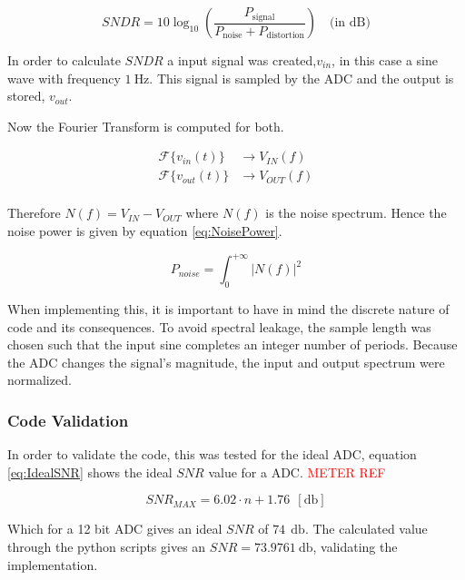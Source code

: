 \begin{equation}
    SNDR = 10 \log_{10} \left( \frac{P_{\text{signal}}}{P_{\text{noise}} + P_{\text{distortion}}} \right)  \quad \text{(in dB)}
    \label{eq:SNDR}
\end{equation}

In order to calculate $SNDR$ a input signal was created,$v_{in}$, in this case a sine wave with frequency $\SI{1}{\hertz}$. This signal is sampled by the ADC and the output is stored, $v_{out}$.

Now the Fourier Transform is computed for both.

\begin{equation}
    \begin{split}
        \mathcal{F}\{v_{in}(t)\} &\rightarrow V_{IN}(f)\\
        \mathcal{F}\{v_{out}(t)\} &\rightarrow V_{OUT}(f)\\
    \end{split}
    \label{eq:fourier}
\end{equation}

Therefore $N(f) = V_{IN} - V_{OUT}$ where $N(f)$ is the noise spectrum. Hence the noise power is given by equation \ref{eq:NoisePower}.

\begin{equation}
    P_{noise} = \int_{0}^{+\infty}|N(f)|^2 
    \label{eq:NoisePower}
\end{equation}

When implementing this, it is important to have in mind the discrete nature of code and its consequences. To avoid spectral leakage, the sample length was chosen such that the input sine completes an integer number of periods. Because the ADC changes the signal's magnitude, the input and output spectrum were normalized.

\subsubsection{Code Validation}

In order to validate the code, this was tested for the ideal ADC, equation \ref{eq:IdealSNR} shows the ideal $SNR$ value for a ADC. \textcolor{red}{METER REF}

\begin{equation}
    SNR_{MAX} = 6.02\cdot n+1.76~~[\si{\decibel}]
    \label{eq:IdealSNR}
\end{equation}

Which for a 12 bit ADC gives an ideal $SNR$ of $74~~\si{\decibel}$. The calculated value through the python scripts gives an $SNR = 73.9761~\si{\decibel}$, validating the implementation.

